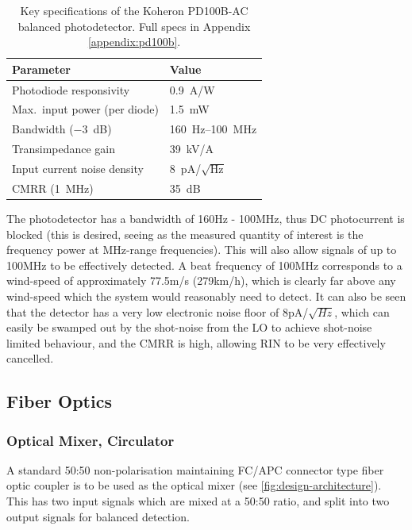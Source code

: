  \begin{table}[H]
 	\centering
 	
 	\begin{tabular}{@{}ll@{}}
 		\toprule
 		\textbf{Parameter} & \textbf{Value} \\
 		\midrule
 		Photodiode responsivity       & 0.9~A/W \\
 		Max.\ input power (per diode) & 1.5~mW \\
 		Bandwidth ($-3$~dB)           & 160~Hz--100~MHz \\
 		Transimpedance gain           & 39~kV/A \\
 		Input current noise density   & 8~pA/$\sqrt{\text{Hz}}$ \\
 		CMRR (1~MHz)                  & 35~dB \\
 		\bottomrule
 	\end{tabular}
 	
 	\caption{Key specifications of the Koheron PD100B-AC balanced photodetector. Full specs in Appendix \ref{appendix:pd100b}.}
 	\label{tab:pd100b}
 \end{table}
 
 The photodetector has a bandwidth of 160Hz - 100MHz, thus DC photocurrent is blocked (this is desired, seeing as the measured quantity of interest is the frequency power at MHz-range frequencies). This will also allow signals of up to 100MHz to be effectively detected. A beat frequency of 100MHz corresponds to a wind-speed of approximately 77.5m/s (279km/h), which is clearly far above any wind-speed which the system would reasonably need to detect. It can also be seen that the detector has a very low electronic noise floor of 8pA/$\sqrt{Hz}$, which can easily be swamped out by the shot-noise from the LO to achieve shot-noise limited behaviour, and the CMRR is high, allowing RIN to be very effectively cancelled. 
 
 \subsection{Fiber Optics}
 \subsubsection{Optical Mixer, Circulator}
A standard 50:50 non-polarisation maintaining FC/APC connector type fiber optic coupler is to be used as the optical mixer (see \autoref{fig:design-architecture}). This has two input signals which are mixed at a 50:50 ratio, and split into two output signals for balanced detection.

